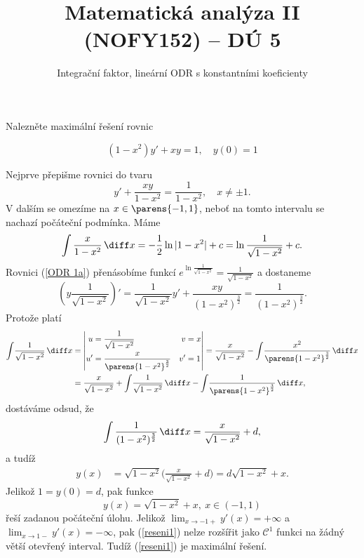 \documentclass[answers]{exam}
\title{\vspace{-3ex}Matematická analýza II (NOFY152) – DÚ 5}
\author{Integrační faktor, lineární ODR s konstantními koeficienty}
\date{\vspace{-5ex}}
\begin{document}
\maketitle

Nalezněte maximální řešení rovnic

\begin{questions}	
	\question
	\begin{equation*}
	(1-x^2)y'+xy=1,\quad y(0)=1
	\end{equation*}
	
	\begin{solution}
		Nejprve p\v repi\v sme rovnici do tvaru
		\begin{equation}\label{ODR 1a}
		y'+\frac{xy}{1-x^2}=\frac{1}{1-x^2},\quad x\ne\pm1.
		\end{equation}
		V dalším se omezíme na $x \in \parens{-1, 1}$, neboť na tomto intervalu se nachazí počáteční podmínka. Máme
		\begin{align*}
		\int\frac{x}{1-x^2}\, \diff x=-\frac{1}{2}\ln|1-x^2|+c=\ln\frac{1}{\sqrt{1-x^2}}+c.
		\end{align*}
		Rovnici (\ref{ODR 1a}) p\v ren\'asob\'ime funkc\'i $e^{\ln\frac{1}{\sqrt{1-x^2}}}=\frac{1}{\sqrt{1-x^2}}$ a dostaneme
		\begin{equation}
		\label{eq:9}
		\left(y\frac{1}{\sqrt{1-x^2}}\right)'=\frac{1}{\sqrt{1-x^2}}y'+\frac{xy}{(1-x^2)^{\frac{3}{2}}}=\frac{1}{(1-x^2)^{\frac{3}{2}}}. 
		\end{equation}
		Protože platí
		\begin{align*}
			\int \! 
				\frac{1}{\sqrt{1 - x^2}} 
			\, \diff x
			&=
	    \left| 
	      \begin{aligned}
	        u &= \frac{1}{\sqrt{1-x^2}} & v &= x
	        \\
	        u' &= \frac{x}{\parens{1 - x^2}^{\frac{3}{2}}} & v' &= 1
	      \end{aligned}
	    \right|
	    =
	    \frac{x}{\sqrt{1 - x^2}}
	    -
	    \int \!
		    \frac{x^2}{\parens{1 - x^2}^{\frac{3}{2}}}
		  \, \diff x
		  \\
	    &=
	    \frac{x}{\sqrt{1 - x^2}}
	    +
	    \int \! 
	    	\frac{1}{\sqrt{1 - x^2}} 
	    \, \diff x
	    -
	    \int \! 
	    	\frac{1}{\parens{1 - x^2}^{\frac{3}{2}}} 
	   	\, \diff x,
		\end{align*}
		dostáváme odsud, že
		\begin{equation*}
		\int\frac{1}{(1-x^2)^{\frac{3}{2}}}\,\diff x
		=
		\frac{x}{\sqrt{1-x^2}}+d,
		\end{equation*}
		a tud\'i\v z 
		\begin{align*}
		y(x)&=\sqrt{1-x^2}\big(\frac{x}{\sqrt{1-x^2}}+d\big)=d\sqrt{1-x^2}+x. 
		\end{align*}
		Jeliko\v z $1=y(0)=d$, pak funkce
		\begin{equation}\label{reseni1}
		y(x)=\sqrt{1-x^2}+x,\ x\in(-1,1)
		\end{equation}
		\v re\v s\'i zadanou počáteční úlohu. Jeliko\v z $\lim_{x \to -1+}y'(x)=+\infty$ a $\lim_{x \to 1-} y'(x)=-\infty$, pak (\ref{reseni1}) nelze roz\v s\'i\v rit jako $\mathcal C^1$ funkci na \v z\'adn\'y v\v et\v s\'i otevřený interval. Tud\'i\v z (\ref{reseni1}) je maxim\'aln\'i \v re\v sen\'i.
		

\end{solution}
\end{questions}
\end{document}
